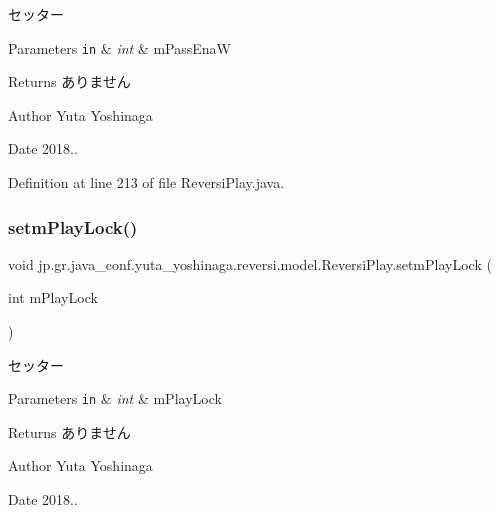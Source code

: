 セッター 


\begin{DoxyParams}[1]{Parameters}
\mbox{\tt in}  & {\em int} & m\+Pass\+EnaW \\
\hline
\end{DoxyParams}
\begin{DoxyReturn}{Returns}
ありません 
\end{DoxyReturn}
\begin{DoxyAuthor}{Author}
Yuta Yoshinaga 
\end{DoxyAuthor}
\begin{DoxyDate}{Date}
2018.. 
\end{DoxyDate}


Definition at line 213 of file Reversi\+Play.\+java.

\mbox{\label{classjp_1_1gr_1_1java__conf_1_1yuta__yoshinaga_1_1reversi_1_1model_1_1_reversi_play_abd7812c4b8e0708b18e666620973b000}} 
\subsubsection{\texorpdfstring{setm\+Play\+Lock()}{setmPlayLock()}}
{\footnotesize\ttfamily void jp.\+gr.\+java\+\_\+conf.\+yuta\+\_\+yoshinaga.\+reversi.\+model.\+Reversi\+Play.\+setm\+Play\+Lock (\begin{DoxyParamCaption}\item[{int}]{m\+Play\+Lock }\end{DoxyParamCaption})}



セッター 


\begin{DoxyParams}[1]{Parameters}
\mbox{\tt in}  & {\em int} & m\+Play\+Lock \\
\hline
\end{DoxyParams}
\begin{DoxyReturn}{Returns}
ありません 
\end{DoxyReturn}
\begin{DoxyAuthor}{Author}
Yuta Yoshinaga 
\end{DoxyAuthor}
\begin{DoxyDate}{Date}
2018.. 
\end{DoxyDate}


